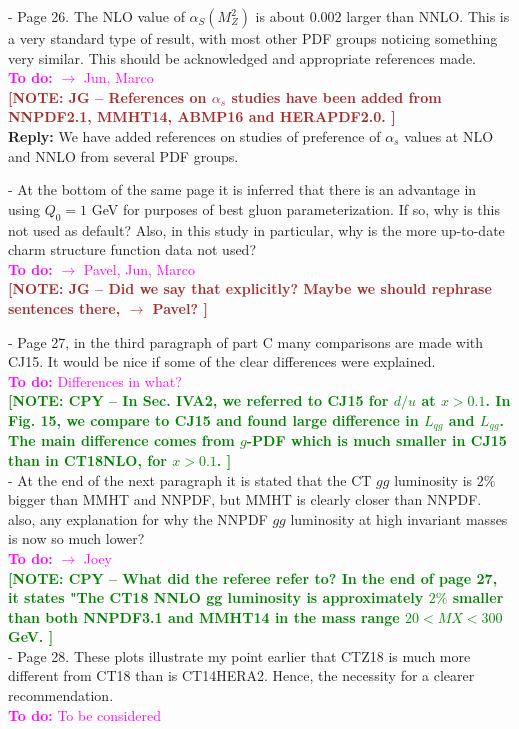 \documentclass[aps,prd,amsmath,nofootinbib,floatfix,fleqn]{revtex4}
\newcommand{\TODO}[1]{\textcolor{magenta}{
\quad\vspace{3pt} \\ {\bf To do:} #1 \\
}}
\newcommand{\REPLY}[1]{\textcolor{redish}{\quad \\
{\bf Reply:} #1 \\
}}
\newcommand{\NOTECPY}[1]{\textcolor{green}{ \bf[NOTE: CPY -- #1 ]}}
\newcommand{\NOTEJG}[1]{\textcolor{brown}{ \bf[NOTE: JG -- #1 ]}}
\begin{document}
- Page 26. The NLO value of $\alpha_S(M_Z^2)$ is about $0.002$ larger than NNLO.
This is a very standard type of result, with most other PDF groups noticing
something very similar. This should be acknowledged and appropriate references
made.
\TODO{$\to$ Jun, Marco}
\NOTEJG{References on $\alpha_s$ studies have been added from NNPDF2.1, MMHT14, ABMP16 and HERAPDF2.0.}
\REPLY{We have added references on studies of preference of $\alpha_s$ values
at NLO and NNLO from several PDF groups.}

- At the bottom of the same page it is inferred that there is an advantage in
using $Q_0=1$ GeV for purposes of best gluon parameterization. If so, why is
this not used as default? Also, in this study in particular, why is the more
up-to-date charm structure function data not used?
\TODO{$\to$ Pavel, Jun, Marco}
\NOTEJG{Did we say that explicitly? Maybe we should rephrase sentences there, $\to$ Pavel?}

- Page 27, in the third paragraph of part C many comparisons are made with CJ15.
It would be nice if some of the clear differences were explained.
\TODO{Differences in what?} 
\NOTECPY{In Sec. IVA2, we referred to CJ15 for $d/u$ at $x>0.1$. In Fig. 15, we compare to CJ15 and found large difference in $L_{qg}$ and $L_{gg}$.
The main difference comes from $g$-PDF which is much smaller in CJ15 than in CT18NLO, for $x>0.1$. 
}\\


 - At the end of the next paragraph it is stated that the CT $gg$ luminosity is $2\%$ bigger than MMHT and NNPDF, but MMHT is clearly closer than NNPDF. also,
any explanation for why the NNPDF $gg$ luminosity at high invariant masses is
now so much lower?
\TODO{$\to$ Joey}
\NOTECPY{What did the referee refer to? In the end of page 27, it states "The CT18 NNLO gg luminosity is approximately $2\%$ smaller than both
NNPDF3.1 and MMHT14 in the mass range $20 < MX < 300$ GeV.}\\
	
	

- Page 28. These plots illustrate my point earlier that CTZ18 is much more
different from CT18 than is CT14HERA2. Hence, the necessity for a clearer
recommendation.
\TODO{To be considered}
\end{document}
